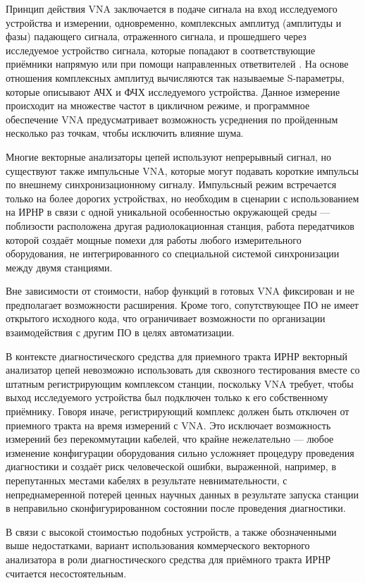 \documentclass{report}
\begin{document}
Принцип действия VNA заключается в подаче сигнала на вход исследуемого устройства и измерении, одновременно, комплексных амплитуд (амплитуды и фазы) падающего сигнала, отраженного сигнала, и прошедшего через исследуемое устройство сигнала, которые попадают в соответствующие приёмники напрямую или при помощи направленных ответвителей \cite{vna1}. На основе отношения комплексных амплитуд вычисляются так называемые S-параметры, которые описывают АЧХ и ФЧХ исследуемого устройства. Данное измерение происходит на множестве частот в цикличном режиме, и программное обеспечение VNA предусматривает возможность усреднения по пройденным несколько раз точкам, чтобы исключить влияние шума.

Многие векторные анализаторы цепей используют непрерывный сигнал, но существуют также импульсные VNA, которые могут подавать короткие импульсы по внешнему синхронизационному сигналу. Импульсный режим встречается только на более дорогих устройствах, но необходим в сценарии с использованием на ИРНР в связи с одной уникальной особенностью окружающей среды --- поблизости расположена другая радиолокационная станция, работа передатчиков которой создаёт мощные помехи для работы любого измерительного оборудования, не интегрированного со специальной системой синхронизации между двумя станциями.

Вне зависимости от стоимости, набор функций в готовых VNA фиксирован и не предполагает возможности расширения. Кроме того, сопутствующее ПО не имеет открытого исходного кода, что ограничивает возможности по организации взаимодействия с другим ПО в целях автоматизации.

В контексте диагностического средства для приемного тракта ИРНР векторный анализатор цепей невозможно использовать для сквозного тестирования вместе со штатным регистрирующим комплексом станции, поскольку VNA требует, чтобы выход исследуемого устройства был подключен только к его собственному приёмнику. Говоря иначе, регистрирующий комплекс должен быть отключен от приемного тракта на время измерений с VNA. Это исключает возможность измерений без перекоммутации кабелей, что крайне нежелательно --- любое изменение конфигурации оборудования сильно усложняет процедуру проведения диагностики и создаёт риск человеческой ошибки, выраженной, например, в перепутанных местами кабелях в результате невнимательности, с непреднамеренной потерей ценных научных данных в результате запуска станции в неправильно сконфигурированном состоянии после проведения диагностики.

В связи с высокой стоимостью подобных устройств, а также обозначенными выше недостатками, вариант использования коммерческого векторного анализатора в роли диагностического средства для приёмного тракта ИРНР считается несостоятельным.
\end{document}
